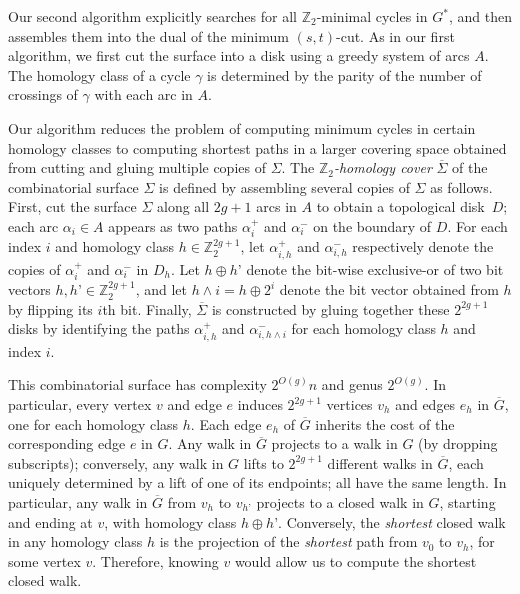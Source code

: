\documentclass[natbib]{svcyclop}
\def\Z{\mathbb{Z}}
\begin{document}
Our second algorithm \cite{en-mcsnc-11} explicitly searches for all $\Z_2$-minimal cycles in $G^*$, and then assembles them into the dual of the minimum $(s,t)$-cut.
As in our first algorithm, we first cut the surface into a disk using a greedy system of arcs $A$.  The homology class of a cycle $\gamma$ is determined by the parity of the number of crossings of $\gamma$ with each arc in $A$.

Our algorithm reduces the problem of computing minimum cycles in certain homology classes to computing shortest paths in a larger covering space obtained from cutting and gluing multiple copies of $\Sigma$.
The \emph{$\Z_2$-homology cover} $\overline\Sigma$ of the combinatorial surface $\Sigma$ is defined by assembling several copies of $\Sigma$ as follows.  First, cut the surface $\Sigma$ along all $2g+1$ arcs in $A$ to obtain a topological disk~$D$; each arc $\alpha_i\in A$ appears as two paths $\alpha_i^+$ and $\alpha_i^-$ on the boundary of $D$.  For each index $i$ and homology class $h\in\Z_2^{2g+1}$, let $\alpha^+_{i,h}$ and $\alpha^-_{i,h}$ respectively denote the copies of $\alpha_i^+$ and $\alpha_i^-$ in $D_h$.  Let $h\oplus h’$ denote the bit-wise exclusive-or of two bit vectors $h, h’\in\Z_2^{2g+1}$, and let $h \land i = h\oplus 2^i$ denote the bit vector obtained from $h$ by flipping its $i$th bit.  Finally, $\overline\Sigma$ is constructed by gluing together these $2^{2g+1}$ disks by identifying the paths $\alpha^+_{i,h}$ and $\alpha^-_{i,h \land i}$ for each homology class $h$ and index $i$.  

This combinatorial surface has complexity $2^{O(g)}n$ and genus $2^{O(g)}$.  In particular, 
every vertex $v$ and edge $e$ induces $2^{2g+1}$ vertices $v_h$ and edges $e_h$ in $\overline{G}$, one for each homology class $h$.  Each edge $e_h$ of $\overline{G}$ inherits the cost of the corresponding edge $e$ in $G$.  
Any walk in $\overline{G}$ projects to a walk in $G$ (by dropping subscripts); conversely, any walk in $G$ lifts to $2^{2g+1}$ different walks in $\overline{G}$, each uniquely determined by a lift of one of its endpoints; all have the same length.  In particular, any walk in $\overline{G}$ from $v_h$ to $v_{h’}$ projects to a closed walk in $G$, starting and ending at $v$, with homology class $h\oplus h’$.  Conversely, the \emph{shortest} closed walk in any homology class $h$ is the projection of the \emph{shortest} path from $v_0$ to $v_h$, for some vertex $v$.
Therefore, knowing $v$ would allow us to compute the shortest closed walk.
\end{document}
